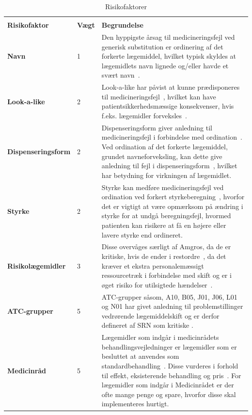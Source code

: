 \begin{longtable}{p{3.5cm}|p{1.1cm}|p{9.2cm}}
	\caption{Risikofaktorer} \vspace{0.2cm}
	\label{table:features} \\
\cellcolor[HTML]{C0C0C0} {\textbf{Risikofaktor}} & \cellcolor[HTML]{C0C0C0} {\textbf{Vægt}} & \cellcolor[HTML]{C0C0C0} {\textbf{Begrundelse}} \vspace{0.2cm} \\ \hline
\textbf{Navn} & 1 & Den hyppigste årsag til medicineringsfejl ved generisk substitution er ordinering af det forkerte lægemiddel, hvilket typisk skyldes at lægemidlets navn lignede og/eller havde et svært navn~\citep{Hakonsen2010}. \\  \hline 
\textbf{Look-a-like} & 2 & Look-a-like har påvist at kunne prædisponeres til medicineringsfejl~\citep{Wittich2014}, hvilket kan have patientsikkerhedsmæssige konsekvenser, hvis f.eks. lægemidler forveksles~\citep{DanskSelskabforPatientsikkerhed2009}.\\  \hline 
\textbf{Dispenseringsform} & 2 & Dispenseringsform giver anledning til medicineringsfejl i forbindelse med ordination~\citep{Agrawal2009}. Ved ordination af det forkerte lægemiddel, grundet navneforveksling, kan dette give anledning til fejl i dispenseringsform~\citep{DanskSelskabforPatientsikkerhed2009}, hvilket har betydning for virkningen af lægemidlet.
\\ \hline 
\textbf{Styrke} & 2 & Styrke kan medføre medicineringsfejl ved ordination ved forkert styrkeberegning~\citep{Agrawal2009}, hvorfor det er vigtigt at være opmærksom på  ændring i styrke for at undgå beregningsfejl, hvormed patienten kan risikere at få en højere eller lavere styrke end ordineret.\\ \hline
\textbf{Risikolægemidler} & 3 & Disse overvåges særligt af Amgros, da de er kritiske, hvis de ender i restordre~\citep{Amgros}, da det kræver et ekstra personalemæssigt ressourcetræk i forbindelse med skift og er i øget risiko for utilsigtede hændelser~\citep{Amgros}. \\ \hline 
\textbf{ATC-grupper} & 5 & ATC-grupper såsom, A10, B05, J01, J06, L01 og N01 har givet anledning til problemstillinger vedrørende lægemiddelskift og er derfor defineret af SRN som kritiske \citep{SRN}. \\ \hline 
\textbf{Medicinråd} & 5 & Lægemidler som indgår i medicinrådets behandlingsvejledninger er lægemidler som er besluttet at anvendes som standardbehandling~\citep{Medicinradet2018}. Disse vurderes i forhold til effekt, eksisterende behandling og pris~\citep{Medicinradet2018}. For lægemidler som indgår i Medicinrådet er der ofte mange penge og spare, hvorfor disse skal implementeres hurtigt. \\ \hline 
    \end{longtable}

